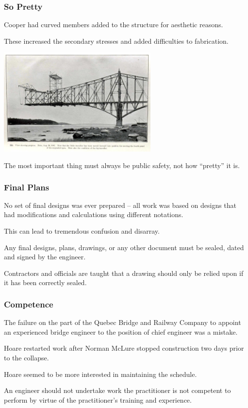 \begin{frame}
\frametitle{So Pretty}

Cooper had curved members added to the structure for aesthetic reasons.

These increased the secondary stresses and added difficulties to fabrication.

\begin{center}
\includegraphics[width=0.6\textwidth]{images/curved-beams}
\end{center}

The most important thing must always be public safety, not how ``pretty'' it is.

\end{frame}



\begin{frame}
\frametitle{Final Plans}

No set of final designs was ever prepared -- all work was based on designs that had modifications and calculations using different notations.

This can lead to tremendous confusion and disarray.

Any final designs, plans, drawings, or any other document must be sealed, dated and signed by the engineer.


Contractors and officials are taught that a drawing should only be relied upon if it has been correctly sealed.

\end{frame}



\begin{frame}
\frametitle{Competence}

The failure on the part of the Quebec Bridge and Railway Company to appoint an experienced bridge engineer to the position of chief engineer was a mistake.


Hoare restarted work after Norman McLure stopped construction two days prior to the collapse.


Hoare seemed to be more interested in maintaining the schedule.


An engineer should not undertake work the practitioner is not competent to perform by virtue of the practitioner's training and experience.

\end{frame}



